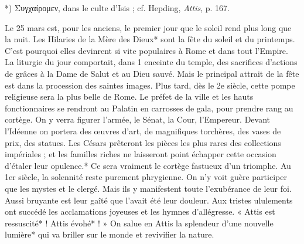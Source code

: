 \documentclass[a4paper, 11pt, oneside, polutonikogreek, french]{article}
\begin{document}
*) Συγχαίρομεν, dans le culte d'Isis ; cf. Hepding, \emph{Attis}, p. 167.

Le 25 mars est, pour les anciens, le premier jour que le soleil rend plus long que la nuit. Les Hilaries de la Mère des Dieux* sont la fête du soleil et du printemps. C'est pourquoi elles devinrent si vite populaires à Rome et dans tout l'Empire. La liturgie du jour comportait, dans 1 enceinte du temple, des sacrifices d'actions de grâces à la Dame de Salut et au Dieu sauvé. Mais le principal attrait de la fête est dans la procession des saintes images. Plus tard, dès le 2e siècle, cette pompe religieuse sera la plus belle de Rome. Le préfet de la ville et les hauts fonctionnaires se rendront au Palatin en carrosses de gala, pour prendre rang au cortège. On y verra figurer l'armée, le Sénat, la Cour, l'Empereur. Devant l'Idéenne on portera des œuvres d'art, de magnifiques torchères, des vases de prix, des statues. Les Césars prêteront les pièces les plus rares des collections impériales ; et les familles riches ne laisseront point échapper cette occasion d'étaler leur opulence.* Ce sera vraiment le cortège fastueux d'un triomphe. Au 1er siècle, la solennité reste purement phrygienne. On n'y voit guère participer que les mystes et le clergé. Mais ils y manifestent toute l'exubérance de leur foi. Aussi bruyante est leur gaîté que l'avait été leur douleur. Aux tristes ululements ont succédé les acclamations joyeuses et les hymnes d'allégresse. « Attis est ressuscité* ! Attis évohé* ! » On salue en Attis la splendeur d'une nouvelle lumière* qui va briller sur le monde et revivifier la nature.
\end{document}
